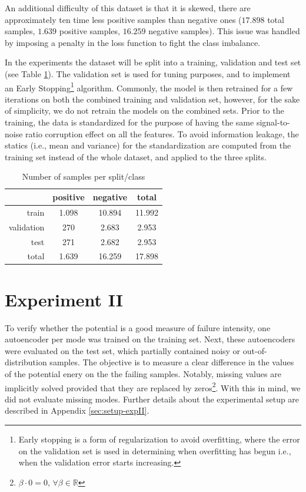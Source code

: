 An additional difficulty of this dataset is that it is skewed, there are approximately ten time less positive samples than negative ones ($17.898$ total samples, $1.639$ positive samples, $16.259$ negative samples). This issue was handled by imposing a penalty in the loss function to fight the class imbalance.

In the experiments the dataset will be split into a training, validation and test set (see Table \ref{tab:split}). The validation set is used for tuning purposes, and to implement an Early Stopping\footnote{Early stopping \citep{early-stopping} is a form of regularization to avoid overfitting, where the error on the validation set is used in determining when overfitting has begun i.e., when the validation error starts increasing.} algorithm. Commonly, the model is then retrained for a few iterations on both the combined training and validation set, however, for the sake of simplicity, we do not retrain the models on the combined sets. Prior to the training, the data is standardized for the purpose of having the same signal-to-noise ratio corruption effect on all the features. To avoid information leakage, the statics (i.e., mean and variance) for the standardization are computed from the training set instead of the whole dataset, and applied to the three splits.
\begin{table}
\centering
\begin{tabular}{ r|cc|c } 
  & positive & negative & total \\ 
 \hline \hline
 train & 1.098 & 10.894 & 11.992 \\
 validation & 270 & 2.683 & 2.953 \\  
 test & 271 & 2.682 & 2.953 \\ 
 \hline
 total & 1.639 & 16.259 & 17.898 \\ 
 \hline
\end{tabular}
 \caption{Number of samples per split/class}
\label{tab:split}
\end{table}


\section{Experiment II}\label{sec:expII}
To verify whether the potential is a good measure of failure intensity, one autoencoder per mode was trained on the training set. Next, these autoencoders were evaluated on the test set, which partially contained noisy or out-of-distribution samples. The objective is to measure a clear difference in the values of the potential enery on the the failing samples. Notably, missing values are implicitly solved provided that they are replaced by zeros\footnote{$\beta\cdot 0 = 0,\,\forall \beta \in \mathbb{R}$}. With this in mind, we did not evaluate missing modes. Further details about the experimental setup are described in Appendix \ref{sec:setup-expII}.

